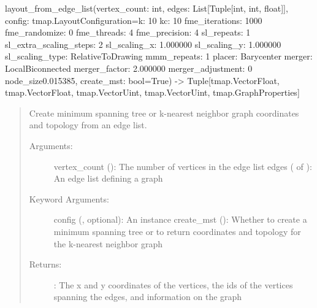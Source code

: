 \documentclass[letterpaper,10pt,english]{sphinxmanual}
\begin{document}

\begin{fulllineitems}
\label{\detokenize{documentation:tmap.layout_from_edge_list}}
layout\_from\_edge\_list(vertex\_count: int, edges: List{[}Tuple{[}int, int, float{]}{]}, config: tmap.LayoutConfiguration=k: 10
kc: 10
fme\_iterations: 1000
fme\_randomize: 0
fme\_threads: 4
fme\_precision: 4
sl\_repeats: 1
sl\_extra\_scaling\_steps: 2
sl\_scaling\_x: 1.000000
sl\_scaling\_y: 1.000000
sl\_scaling\_type: RelativeToDrawing
mmm\_repeats: 1
placer: Barycenter
merger: LocalBiconnected
merger\_factor: 2.000000
merger\_adjustment: 0
node\_size0.015385, create\_mst: bool=True) -\textgreater{} Tuple{[}tmap.VectorFloat, tmap.VectorFloat, tmap.VectorUint, tmap.VectorUint, tmap.GraphProperties{]}
\begin{quote}

Create minimum spanning tree or k-nearest neighbor graph coordinates and topology from an edge list.
\begin{description}
\item[{Arguments:}] \leavevmode
vertex\_count (): The number of vertices in the edge list
edges ( of ): An edge list defining a graph

\item[{Keyword Arguments:}] \leavevmode
config ({\hyperref[\detokenize{documentation:tmap.LayoutConfiguration}]{}}, optional): An {\hyperref[\detokenize{documentation:tmap.LayoutConfiguration}]{}} instance
create\_mst (): Whether to create a minimum spanning tree or to return coordinates and topology for the k-nearest neighbor graph

\item[{Returns:}] \leavevmode
{}: The x and y coordinates of the vertices, the ids of the vertices spanning the edges, and information on the graph

\end{description}
\end{quote}

\end{fulllineitems}
\end{document}
